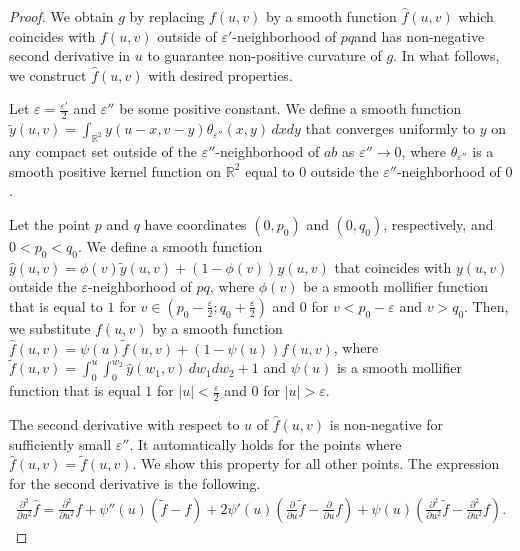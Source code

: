\documentclass[12pt]{article}
\numberwithin{equation}{section}
\theoremstyle{definition}
\newcommand{\eps}{\varepsilon}
\begin{document}
\begin{proof}
We obtain $g$ by replacing $f(u,v)$ by a smooth function $\hat f(u,v)$ which coincides with $f(u,v)$ outside of $\eps'$-neighborhood of $pq$and has non-negative second derivative in $u$ to guarantee non-positive curvature of $g$. In what follows, we construct $\hat f(u,v)$ with desired properties.

Let $\eps = \frac{\eps'}{2}$ and $\eps''$ be some positive constant. We define a smooth function $\tilde y(u,v) =\int_{\mathbb R^2}y(u-x, v-y)\theta_{\eps''}(x,y) \, dxdy$ that converges uniformly to $y$ on any compact set outside of the $\eps''$-neighborhood of $ab$ as $\eps''\rightarrow 0$, where $\theta_{\eps''}$ is a smooth positive kernel function on $\mathbb R^2$ equal to $0$ outside the $\eps''$-neighborhood of $0$. 

Let the point $p$ and $q$ have coordinates $(0,p_0)$ and $(0, q_0)$, respectively, and $0<p_0<q_0$. We define a smooth function $\hat y(u,v) = \phi(v)\tilde y(u,v)+(1-\phi(v))y(u,v)$ that coincides with $y(u,v)$ outside the $\eps$-neighborhood of $pq$, where $\phi(v)$ be a smooth mollifier function that is equal to $1$ for $v\in(p_0-\frac{\eps}{2}; q_0+\frac{\eps}{2})$ and $0$ for $v<p_0-\eps$ and $v>q_0$. Then, we substitute $f(u,v)$ by a smooth function $\hat f(u,v) = \psi(u)\tilde f(u,v) + (1-\psi(u)) f(u,v)$, where $\tilde f(u,v)=\int_0^u\int_0^{w_2}\hat y(w_1,v) \, dw_1dw_2 + 1$ and $\psi(u)$ is a smooth mollifier function that is equal $1$ for $|u|<\frac{\eps}{2}$ and $0$ for $|u|>\eps$.  
 
The second derivative with respect to $u$ of $\hat f(u,v)$ is non-negative for sufficiently small $\eps''$. It automatically holds for the points where $\hat f(u,v)=\tilde f(u,v)$. We show this property for all other points. The expression for the second derivative is the following.
\begin{align}\label{second_deriv_mod_f}
\frac{\partial^2}{\partial u^2}\hat f = \frac{\partial^2}{\partial u^2}f + \psi''(u)(\tilde f - f) + 2\psi'(u)\left(\frac{\partial}{\partial u}\tilde f - \frac{\partial}{\partial u}f \right) + \psi(u) \left(\frac{\partial^2}{\partial u^2}\tilde f - \frac{\partial^2}{\partial u^2}f \right).
\end{align}


\end{proof}
\end{document}
